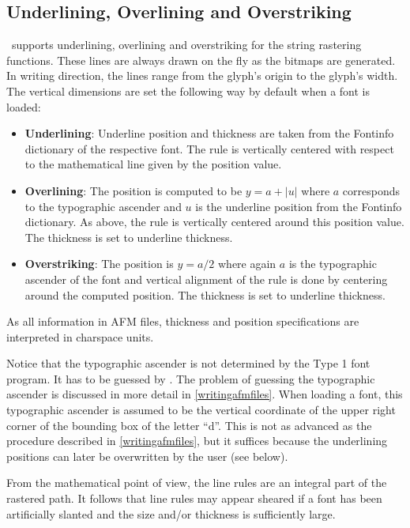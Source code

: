 \subsection{Underlining, Overlining and Overstriking}
\label{underlining}%
\tonelib\ supports underlining, overlining and overstriking for the string
rastering functions. These lines are always drawn on the fly as the bitmaps
are generated. In writing direction, the lines range from the glyph's origin
to the glyph's width. The vertical dimensions are set the following way by
default when a font is loaded:
\begin{itemize}
\item {\bf Underlining}: Underline position and thickness are taken from the
  Fontinfo dictionary of the respective font. The rule is vertically centered
  with respect to the mathematical line given by the position value.
\item {\bf Overlining}: The position is computed to be $y=a+|u|$ where $a$
  corresponds to the typographic ascender and $u$ is the underline position
  from the Fontinfo dictionary. As above, the rule is vertically centered
  around this position value. The thickness is set to underline thickness.
\item {\bf Overstriking}: The position is $y=a/2$ where again $a$ is the
  typographic ascender of the font and vertical alignment of the rule is done
  by centering around the computed position. The thickness is set to underline
  thickness. 
\end{itemize}
As all information in AFM files, thickness and position specifications are
interpreted in charspace units.

Notice that the typographic ascender is not determined by the Type 1 font
program. It has to be guessed by \tonelib. The problem of guessing the
typographic ascender is discussed in more detail in \ref{writingafmfiles}.
When loading a font, this typographic ascender is assumed to be the vertical
coordinate of the upper right corner of the bounding box of the letter ``d''.
This is not as advanced as the procedure described in \ref{writingafmfiles},
but it suffices because the underlining positions can later be overwritten by
the user (see below).

From the mathematical point of view, the line rules are an integral part of
the rastered path. It follows that line rules may appear sheared if a font has
been artificially slanted and the size and/or thickness is sufficiently large.

